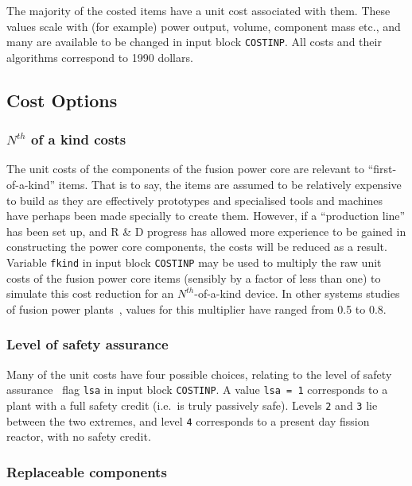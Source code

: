 The majority of the costed items have a unit cost associated with them. These
values scale with (for example) power output, volume, component mass etc., and
many are available to be changed in input block {\tt COSTINP}. All costs and
their algorithms correspond to 1990 dollars.

\setlength{\parskip}{0mm}
\subsection{Cost Options}

\subsubsection{$N^{th}$ of a kind costs}

The unit costs of the components of the fusion power core are relevant to
``first-of-a-kind'' items. That is to say, the items are assumed to be
relatively expensive to build as they are effectively prototypes and
specialised tools and machines have perhaps been made specially to create
them. However, if a ``production line'' has been set up, and R \& D progress
has allowed more experience to be gained in constructing the power core
components, the costs will be reduced as a result. Variable \texttt{fkind} in
input block \texttt{COSTINP} may be used to multiply the raw unit costs of the
fusion power core items (sensibly by a factor of less than one) to simulate
this cost reduction for an $N^{th}$-of-a-kind device. In other systems studies
of fusion power plants~\cite{galambos}, values for this multiplier have ranged
from 0.5 to 0.8.

\subsubsection{Level of safety assurance}

Many of the unit costs have four possible choices, relating to the level of
safety assurance~\cite{lsa} flag {\tt lsa} in input block {\tt COSTINP}. A
value {\tt lsa = 1} corresponds to a plant with a full safety credit (i.e.\ is
truly passively safe). Levels {\tt 2} and {\tt 3} lie between the two
extremes, and level {\tt 4} corresponds to a present day fission reactor, with
no safety credit.

\subsubsection{Replaceable components}

